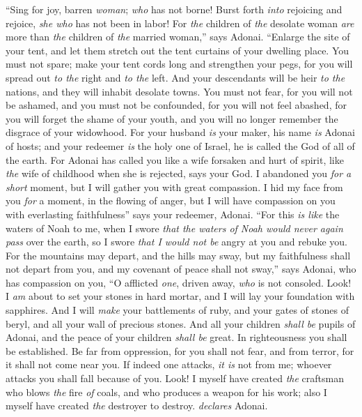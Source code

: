 \begin{biblechapter} %
 “Sing for joy, barren \textit{woman}; \textit{who} has not borne! 
Burst forth \textit{into} rejoicing and rejoice, \textit{she who} has not been in labor! 
For \textit{the} children of \textit{the} desolate woman \textit{are} more than \textit{the} children of \textit{the} married woman,” says Adonai.
\verse “Enlarge the site of your tent, 
and let them stretch out the tent curtains of your dwelling place. 
You must not spare; make your tent cords long 
and strengthen your pegs,
\verse for you will spread out \textit{to the} right and \textit{to the} left. 
And your descendants will be heir \textit{to the} nations, 
and they will inhabit desolate towns.
\verse You must not fear, for you will not be ashamed, 
and you must not be confounded, for you will not feel abashed, 
for you will forget the shame of your youth, 
and you will no longer remember the disgrace of your widowhood.
\verse For your husband \textit{is} your maker, his name \textit{is} Adonai of hosts; 
and your redeemer \textit{is} the holy one of Israel, he is called the God of all of the earth.
\verse For Adonai has called you like a wife forsaken and hurt of spirit, 
like \textit{the} wife of childhood when she is rejected, says your God.
\verse I abandoned you \textit{for a short} moment, 
but I will gather you with great compassion.
\verse I hid my face from you \textit{for} a moment, in the flowing of anger, 
but I will have compassion on you with everlasting faithfulness” says your redeemer, Adonai.
\verse “For this \textit{is like} the waters of Noah to me, 
when I swore \textit{that the waters of Noah would never again pass} over the earth, 
so I swore \textit{that I would not be} angry at you and rebuke you.
\verse For the mountains may depart, 
and the hills may sway, 
but my faithfulness shall not depart from you, 
and my covenant of peace shall not sway,” 
says Adonai, who has compassion on you,
\verse “O afflicted \textit{one}, driven away, \textit{who} is not consoled. 
Look! I \textit{am} about to set your stones in hard mortar, 
and I will lay your foundation with sapphires.
\verse And I will \textit{make} your battlements of ruby, 
and your gates of stones of beryl, 
and all your wall of precious stones.
\verse And all your children \textit{shall be} pupils of Adonai, 
and the peace of your children \textit{shall be} great.
\verse In righteousness you shall be established.
\verse Be far from oppression, for you shall not fear, 
and from terror, for it shall not come near you.
\verse If indeed one attacks, \textit{it is} not from me; 
whoever attacks you shall fall because of you.
\verse Look! I myself have created \textit{the} craftsman who blows \textit{the} fire \textit{of} coals, 
and who produces a weapon for his work; 
also I myself have created \textit{the} destroyer to destroy. \textit{declares} Adonai.
\end{biblechapter}

